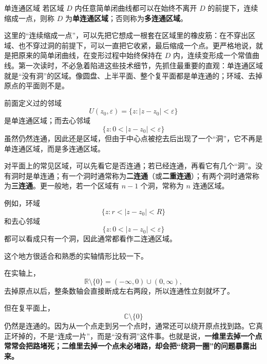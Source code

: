 \begin{dingliyi}{单连通区域}{}
若区域 $D$ 内任意简单闭曲线都可以在始终不离开 $D$ 的前提下，连续缩成一点，则称 $D$ 为\textbf{单连通区域}；否则称为\textbf{多连通区域}。
\end{dingliyi}

\begin{zhu}{}{}
这里的``连续缩成一点''，可以先把它想成一根套在区域里的橡皮筋：在不穿出区域、也不穿过洞的前提下，可以一直把它收紧，最后缩成一个点。更严格地说，就是把原来的简单闭曲线，在变形过程中始终保持在 $D$ 内，连续变形成一个常值曲线。第一次读时，不必急着陷进这些技术细节，先抓住最重要的直观：单连通区域就是``没有洞''的区域。像圆盘、上半平面、整个复平面都是单连通的；环域、去掉原点的平面则不是。
\end{zhu}

\begin{tishi}[把前面的邻域概念和这里连起来]
前面定义过的邻域
\[
    U(z_0,\varepsilon)=\{z:|z-z_0|<\varepsilon\}
\]
是单连通区域；而去心邻域
\[
    \{z:0<|z-z_0|<\varepsilon\}
\]
虽然仍然连通，因此还是区域，但由于中心点被挖去后出现了一个``洞''，它不再是单连通区域，而是多连通区域。
\end{tishi}

\begin{tishi}[怎样粗略判断几连通]
对平面上的常见区域，可以先看它是否连通；若已经连通，再看它有几个``洞''。没有洞时是单连通；有一个洞时通常称为\textbf{二连通}（或\textbf{二重连通}）；有两个洞时通常称为\textbf{三连通}。更一般地，若一个区域有 $n-1$ 个洞，常称为 $n$ 连通区域。

例如，环域
\[
    \{z:r<|z-z_0|<R\}
\]
和去心邻域
\[
    \{z:0<|z-z_0|<\varepsilon\}
\]
都可以看成只有一个洞，因此通常都看作二连通区域。
\end{tishi}

\begin{tishi}[和实轴上的去点集合对照着看]
这个地方很适合和熟悉的实轴情形比较一下。

在实轴上，
\[
    \mathbb{R}\setminus\{0\}=(-\infty,0)\cup(0,\infty),
\]
去掉原点以后，整条数轴会直接断成左右两段，所以连通性立刻就坏了。

但在复平面上，
\[
    \mathbb{C}\setminus\{0\}
\]
仍然是连通的。因为从一个点走到另一个点时，通常还可以绕开原点找到路。它真正坏掉的，不是``连成一片''，而是``没有洞''这件事。也就是说，\textbf{一维里去掉一个点常常会把路堵死；二维里去掉一个点未必堵路，却会把``绕洞一圈''的问题暴露出来。}
\end{tishi}

